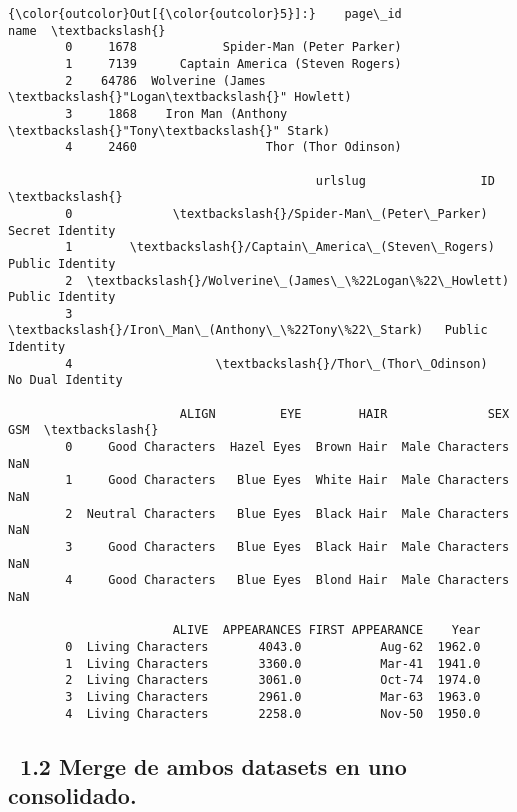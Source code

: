 \documentclass[11pt]{article}
\begin{document}
\begin{Verbatim}[commandchars=\\\{\}]
{\color{outcolor}Out[{\color{outcolor}5}]:}    page\_id                                 name  \textbackslash{}
        0     1678            Spider-Man (Peter Parker)   
        1     7139      Captain America (Steven Rogers)   
        2    64786  Wolverine (James \textbackslash{}"Logan\textbackslash{}" Howlett)   
        3     1868    Iron Man (Anthony \textbackslash{}"Tony\textbackslash{}" Stark)   
        4     2460                  Thor (Thor Odinson)   
        
                                           urlslug                ID  \textbackslash{}
        0              \textbackslash{}/Spider-Man\_(Peter\_Parker)   Secret Identity   
        1        \textbackslash{}/Captain\_America\_(Steven\_Rogers)   Public Identity   
        2  \textbackslash{}/Wolverine\_(James\_\%22Logan\%22\_Howlett)   Public Identity   
        3    \textbackslash{}/Iron\_Man\_(Anthony\_\%22Tony\%22\_Stark)   Public Identity   
        4                    \textbackslash{}/Thor\_(Thor\_Odinson)  No Dual Identity   
        
                        ALIGN         EYE        HAIR              SEX  GSM  \textbackslash{}
        0     Good Characters  Hazel Eyes  Brown Hair  Male Characters  NaN   
        1     Good Characters   Blue Eyes  White Hair  Male Characters  NaN   
        2  Neutral Characters   Blue Eyes  Black Hair  Male Characters  NaN   
        3     Good Characters   Blue Eyes  Black Hair  Male Characters  NaN   
        4     Good Characters   Blue Eyes  Blond Hair  Male Characters  NaN   
        
                       ALIVE  APPEARANCES FIRST APPEARANCE    Year  
        0  Living Characters       4043.0           Aug-62  1962.0  
        1  Living Characters       3360.0           Mar-41  1941.0  
        2  Living Characters       3061.0           Oct-74  1974.0  
        3  Living Characters       2961.0           Mar-63  1963.0  
        4  Living Characters       2258.0           Nov-50  1950.0  
\end{Verbatim}
            
    \subsection{~1.2 Merge de ambos datasets en uno
consolidado.}\label{merge-de-ambos-datasets-en-uno-consolidado.}
\end{document}
